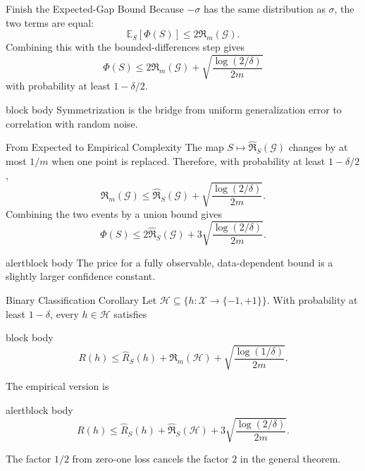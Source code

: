 \documentclass[aspectratio=169,10pt]{beamer}
\newcommand{\X}{\mathcal{X}}
\newcommand{\Hc}{\mathcal{H}}
\newcommand{\Gc}{\mathcal{G}}
\newcommand{\Rhat}{\widehat{R}_S}
\newcommand{\Rad}{\mathfrak{R}}
\newcommand{\RadS}{\widehat{\mathfrak{R}}_S}
\newcommand{\pmone}{\{-1,+1\}}
\newcommand{\E}{\mathbb{E}}
\newcommand{\KeyBox}[1]{%
  \begin{beamercolorbox}[rounded=true,sep=0.22cm,wd=\linewidth]{block body}
    #1
  \end{beamercolorbox}%
}
\newcommand{\OrangeBox}[1]{%
  \begin{beamercolorbox}[rounded=true,sep=0.22cm,wd=\linewidth]{alertblock body}
    #1
  \end{beamercolorbox}%
}
\begin{document}
\begin{frame}[t]{Finish the Expected-Gap Bound}
  \vspace{0.10cm}
  Because $-\sigma$ has the same distribution as $\sigma$, the two terms are equal:
  \[
    \E_S[\Phi(S)]\le 2\Rad_m(\Gc).
  \]
  Combining this with the bounded-differences step gives
  \[
    \Phi(S)
    \le 2\Rad_m(\Gc)
    +\sqrt{\frac{\log(2/\delta)}{2m}}
  \]
  with probability at least $1-\delta/2$.
  \vspace{0.12cm}
  \KeyBox{Symmetrization is the bridge from uniform generalization error to correlation with random noise.}
\end{frame}

\begin{frame}[t]{From Expected to Empirical Complexity}
  \vspace{0.04cm}
  The map $S\mapsto\RadS(\Gc)$ changes by at most $1/m$ when one point is replaced. Therefore, with probability at least $1-\delta/2$,
  \[
    \Rad_m(\Gc)
    \le \RadS(\Gc)
    +\sqrt{\frac{\log(2/\delta)}{2m}}.
  \]
  Combining the two events by a union bound gives
  \[
    \Phi(S)
    \le 2\RadS(\Gc)
    +3\sqrt{\frac{\log(2/\delta)}{2m}}.
  \]
  \vspace{0.08cm}
  \OrangeBox{The price for a fully observable, data-dependent bound is a slightly larger confidence constant.}
\end{frame}

\begin{frame}[t]{Binary Classification Corollary}
  \vspace{0.01cm}
  Let $\Hc\subseteq\{h:\X\to\pmone\}$. With probability at least $1-\delta$, every $h\in\Hc$ satisfies
  \begin{beamercolorbox}[rounded=true,sep=0.18cm,wd=\linewidth]{block body}
    \[
      R(h)
      \le \Rhat(h)
      +\Rad_m(\Hc)
      +\sqrt{\frac{\log(1/\delta)}{2m}}.
    \]
  \end{beamercolorbox}
  The empirical version is
  \begin{beamercolorbox}[rounded=true,sep=0.18cm,wd=\linewidth]{alertblock body}
    \[
      R(h)
      \le \Rhat(h)
      +\RadS(\Hc)
      +3\sqrt{\frac{\log(2/\delta)}{2m}}.
    \]
  \end{beamercolorbox}
  The factor $1/2$ from zero-one loss cancels the factor $2$ in the general theorem.
\end{frame}
\end{document}
